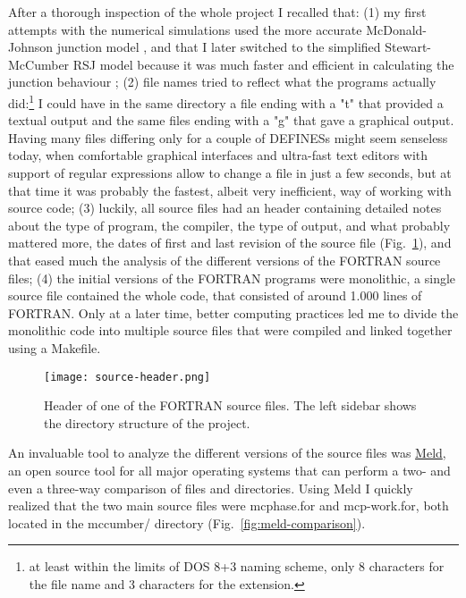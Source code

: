 After a thorough inspection of the whole project I recalled that: 
(1) my first attempts with the numerical simulations used the more accurate McDonald-Johnson junction model \cite{McDonald:1976}, and that I later switched to the simplified Stewart-McCumber RSJ model because it was much faster and efficient in calculating the junction behaviour \cite{McCumber:1968, Stewart:1974}; 
(2) file names tried to reflect what the programs actually did:\footnote{at least within the limits of DOS 8+3 naming scheme, only 8 characters for the file name and 3 characters for the extension.} 
I could have in the same directory a file ending with a "t" that provided a textual output and the same files ending with a "g" that gave a graphical output. Having many files differing only for a couple of \textsf{DEFINES}s might seem senseless today, when comfortable graphical interfaces and ultra-fast text editors with support of regular expressions allow to change a file in just a few seconds, but at that time it was probably the fastest, albeit very inefficient, way of working with source code;
(3) luckily, all source files had an header containing detailed notes about the type of program, the compiler, the type of output, and what probably mattered more, the dates of first and last revision of the source file (Fig.~\ref{fig:source-header}), and that eased much the analysis of the different versions of the FORTRAN source files; 
(4) the initial versions of the FORTRAN programs were monolithic, a single source file contained the whole code, that consisted of around 1.000 lines of FORTRAN. Only at a later time, better computing practices led me to divide the monolithic code into multiple source files that were compiled and linked together using a \textsf{Makefile}.

\begin{figure}[tb]
	\centering
	\texttt{[image: source-header.png]}
	\caption{Header of one of the FORTRAN source files. The left sidebar shows the directory structure of the project.}
	\label{fig:source-header}
\end{figure}


An invaluable tool to analyze the different versions of the source files was \href{http://meldmerge.org/}{Meld}, an open source tool for all major operating systems that can perform a two- and even a three-way comparison of files and directories.
Using Meld I quickly realized that the two main source files were \textsf{mcphase.for} and \textsf{mcp-work.for}, both located in the \textsf{mccumber/} directory  (Fig.~\ref{fig:meld-comparison}).

